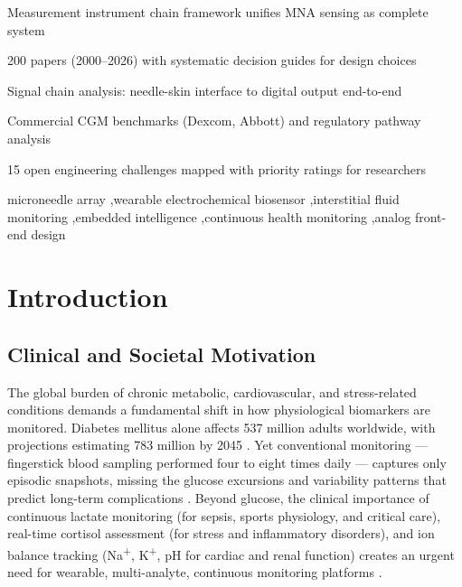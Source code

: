 \documentclass[review,1p]{elsarticle}
\begin{document}
\begin{frontmatter}
\begin{abstract}
Covering 200 papers from 2000 to 2026 with systematic decision guides for material$\times$geometry$\times$modality selection, this review provides both newcomers and domain experts with a unified cognitive framework for understanding, designing, and evaluating next-generation MNA-WES systems.
\end{abstract}

\begin{highlights}
\item Measurement instrument chain framework unifies MNA sensing as complete system
\item 200 papers (2000--2026) with systematic decision guides for design choices
\item Signal chain analysis: needle-skin interface to digital output end-to-end
\item Commercial CGM benchmarks (Dexcom, Abbott) and regulatory pathway analysis
\item 15 open engineering challenges mapped with priority ratings for researchers
\end{highlights}

\begin{keyword}
microneedle array \sep wearable electrochemical biosensor \sep interstitial fluid monitoring \sep embedded intelligence \sep continuous health monitoring \sep analog front-end design
\end{keyword}

\end{frontmatter}

\linenumbers

\section{Introduction}
\label{sec:intro}

\subsection{Clinical and Societal Motivation}
\label{subsec:motivation}

The global burden of chronic metabolic, cardiovascular, and stress-related conditions demands a fundamental shift in how physiological biomarkers are monitored. Diabetes mellitus alone affects 537 million adults worldwide, with projections estimating 783 million by 2045 \cite{IDF2021}. Yet conventional monitoring — fingerstick blood sampling performed four to eight times daily — captures only episodic snapshots, missing the glucose excursions and variability patterns that predict long-term complications \cite{TeymourianReview2021}. Beyond glucose, the clinical importance of continuous lactate monitoring (for sepsis, sports physiology, and critical care), real-time cortisol assessment (for stress and inflammatory disorders), and ion balance tracking (Na\textsuperscript{+}, K\textsuperscript{+}, pH for cardiac and renal function) creates an urgent need for wearable, multi-analyte, continuous monitoring platforms \cite{Min2021NFC}.
\end{document}
